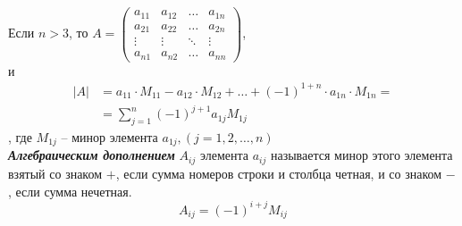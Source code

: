 \documentclass[12pt, fleqn]{article}
\begin{document}
Если $n>3$, то $
	A  = \left(
	\begin{array}{cccc}
		a_{11} & a_{12} & \ldots & a_{1n}\\
		a_{21} & a_{22} & \ldots & a_{2n}\\
		\vdots & \vdots & \ddots & \vdots\\
		a_{n1} & a_{n2} & \ldots & a_{nn}
	\end{array}
	\right)$,\\
и 
\begin{align*}
	\left|A\right| &= a_{11}\cdot M_{11} - a_{12}\cdot M_{12}+\dots+\left(-1\right)^{1+n}\cdot a_{1n}\cdot M_{1n}=\\
	&=\sum_{j=1}^{n}\left(-1\right)^{j+1}a_{1j}M_{1j}
\end{align*}
, где $M_{1j}$ -- минор элемента $a_{1j}, (j=1,2,\dots,n)$\\
\textbf{\textit{Алгебраическим дополнением}} $A_{ij}$ элемента $a_{ij}$ называется минор этого элемента взятый со знаком $+$, если сумма номеров строки и столбца четная, и со знаком $-$, если сумма нечетная.
$$A_{ij}=\left(-1\right)^{i+j}M_{ij}$$
\end{document}
